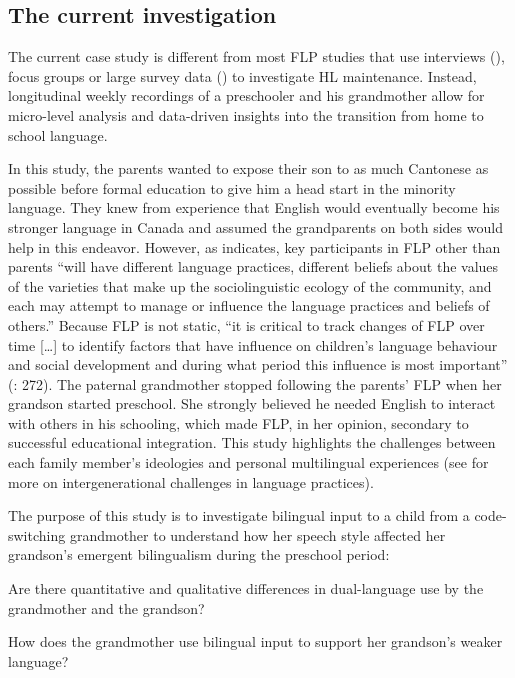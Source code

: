 \documentclass[output=paper,colorlinks,citecolor=brown]{langscibook}
\begin{document}
\subsection{The current investigation}\label{sec:quay:2.2}

The current case study is different from most FLP studies that use interviews (\citealt{ShenJiang2021}), focus groups \citep{TranEtAl2022} or large survey data (\citealt{Little2020a, Mu2014}) to investigate HL maintenance. Instead, longitudinal weekly recordings of a preschooler and his grandmother allow for micro-level analysis and data-driven insights into the transition from home to school language. 

In this study, the parents wanted to expose their son to as much Cantonese as possible before formal education to give him a head start in the minority language. They knew from experience that English would eventually become his stronger language in Canada and assumed the grandparents on both sides would help in this endeavor. However, as \citet[5]{Spolsky2012} indicates, key participants in FLP other than parents “will have different language practices, different beliefs about the values of the varieties that make up the sociolinguistic ecology of the community, and each may attempt to manage or influence the language practices and beliefs of others.” Because FLP is not static, “it is critical to track changes of FLP over time […] to identify factors that have influence on children’s language behaviour and social development and during what period this influence is most important” (\citealt{Curdt-ChristiansenSun2022}: 272). The paternal grandmother stopped following the parents’ FLP when her grandson started preschool. She strongly believed he needed English to interact with others in his schooling, which made FLP, in her opinion, secondary to successful educational integration. This study highlights the challenges between each family member's ideologies and personal multilingual experiences (see \citealt{Purkarthofer2020} for more on intergenerational challenges in language practices).

The purpose of this study is to investigate bilingual input to a child from a code-switching grandmother to understand how her speech style affected her grandson’s emergent bilingualism during the preschool period: 

\ea
Are there quantitative and qualitative differences in dual-language use by the grandmother and the grandson?
\z


\ea
How does the grandmother use bilingual input to support her grandson’s weaker language? 
\z
\end{document}

